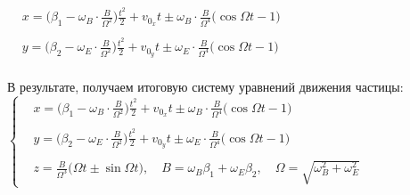 \documentclass[oneside,final,14pt]{extarticle}
\begin{document}
	\begin{math}
		\begin{aligned}
			& x = \bigg(\beta_{1} - \omega_{B} \cdot \frac{B}{\Omega^{2}}\bigg)\frac{t^{2}}{2} + v_{0_{x}}t \pm \omega_{B} \cdot \frac{B}{\Omega^{4}} \Big(\cos{\Omega t} - 1\Big) \\\\
			& y = \bigg(\beta_{2} - \omega_{E} \cdot \frac{B}{\Omega^{2}}\bigg)\frac{t^{2}}{2} + v_{0_{y}}t \pm \omega_{E} \cdot \frac{B}{\Omega^{4}} \Big(\cos{\Omega t} - 1\Big)
		\end{aligned}
	\end{math} \\\\
	
	\noindent В результате, получаем итоговую систему уравнений движения частицы: \\
	
	\begin{math}
		\left\{
		\begin{aligned}
			& x = \bigg(\beta_{1} - \omega_{B} \cdot \frac{B}{\Omega^{2}}\bigg)\frac{t^{2}}{2} + v_{0_{x}}t \pm \omega_{B} \cdot \frac{B}{\Omega^{4}} \Big(\cos{\Omega t} - 1\Big) \\\\
			& y = \bigg(\beta_{2} - \omega_{E} \cdot \frac{B}{\Omega^{2}}\bigg)\frac{t^{2}}{2} + v_{0_{y}}t \pm \omega_{E} \cdot \frac{B}{\Omega^{4}} \Big(\cos{\Omega t} - 1\Big) \\\\
			& z = \frac{B}{\Omega^{3}} \Big(\Omega t \pm \sin{\Omega t}\Big), \quad B = \omega_{B}\beta_{1} + \omega_{E}\beta_{2}, \quad \Omega = \sqrt{\omega_{B}^{2} + \omega_{E}^{2}}
		\end{aligned}
		\right.
	\end{math}
	
\end{document}
